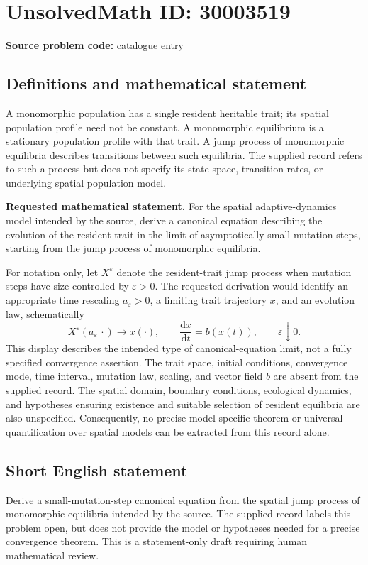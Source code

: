 \documentclass[11pt]{article}
\begin{document}
\section*{UnsolvedMath ID: 30003519}
\textbf{Source problem code:} catalogue entry
\subsection{Definitions and mathematical statement}
A monomorphic population has a single resident heritable trait; its spatial population profile need not be constant. A monomorphic equilibrium is a stationary population profile with that trait. A jump process of monomorphic equilibria describes transitions between such equilibria. The supplied record refers to such a process but does not specify its state space, transition rates, or underlying spatial population model.

\textbf{Requested mathematical statement.} For the spatial adaptive-dynamics model intended by the source, derive a canonical equation describing the evolution of the resident trait in the limit of asymptotically small mutation steps, starting from the jump process of monomorphic equilibria.

For notation only, let \(X^{\varepsilon}\) denote the resident-trait jump process when mutation steps have size controlled by \(\varepsilon>0\). The requested derivation would identify an appropriate time rescaling \(a_{\varepsilon}>0\), a limiting trait trajectory \(x\), and an evolution law, schematically
\[
X^{\varepsilon}(a_{\varepsilon}\,\cdot)\longrightarrow x(\cdot),
\qquad
\frac{\mathrm d x}{\mathrm d t}=b(x(t)),
\qquad \varepsilon\downarrow0.
\]
This display describes the intended type of canonical-equation limit, not a fully specified convergence assertion. The trait space, initial conditions, convergence mode, time interval, mutation law, scaling, and vector field \(b\) are absent from the supplied record. The spatial domain, boundary conditions, ecological dynamics, and hypotheses ensuring existence and suitable selection of resident equilibria are also unspecified. Consequently, no precise model-specific theorem or universal quantification over spatial models can be extracted from this record alone.
\subsection{Short English statement}
Derive a small-mutation-step canonical equation from the spatial jump process of monomorphic equilibria intended by the source. The supplied record labels this problem open, but does not provide the model or hypotheses needed for a precise convergence theorem. This is a statement-only draft requiring human mathematical review.
\end{document}
